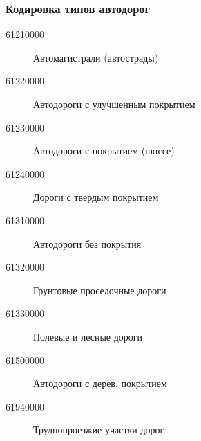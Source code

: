 \begin{frame}
    \frametitle{Кодировка типов автодорог}
    \begin{description}
        \item[61210000] Автомагистрали (автострады)
        \item[61220000] Автодороги с улучшенным покрытием
        \item[61230000] Автодороги с покрытием (шоссе)
        \item[61240000] Дороги с твердым покрытием
        \item[61310000] Автодороги без покрытия
        \item[61320000] Грунтовые проселочные дороги
        \item[61330000] Полевые и лесные дороги
        \item[61500000] Автодороги с дерев. покрытием
        \item[61940000] Труднопроезжие участки дорог
    \end{description}
\end{frame}
